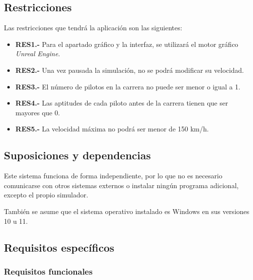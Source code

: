 \subsection{Restricciones}

Las restricciones que tendrá la aplicación son las siguientes:

\begin{itemize}
    \item \textbf{RES1.-} Para el apartado gráfico y la interfaz, se utilizará el motor gráfico \textit{Unreal Engine}.
    \item \textbf{RES2.-} Una vez pausada la simulación, no se podrá modificar su velocidad.
    \item \textbf{RES3.-} El número de pilotos en la carrera no puede ser menor o igual a 1.
    \item \textbf{RES4.-} Las aptitudes de cada piloto antes de la carrera tienen que ser mayores que 0.
    \item \textbf{RES5.-} La velocidad máxima no podrá ser menor de 150 km/h.
\end{itemize}

\subsection{Suposiciones y dependencias}



Este sistema funciona de forma independiente, por lo que no es necesario comunicarse con otros sistemas externos o instalar ningún programa adicional, excepto el propio simulador.

\bigskip

También se asume que el sistema operativo instalado es Windows en sus versiones 10 u 11.

\subsection{Requisitos específicos}

\subsubsection{Requisitos funcionales}

